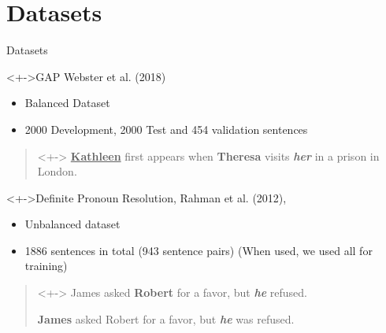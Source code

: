 \documentclass[10pt]{beamer}
\begin{document}
\section{Datasets}
\begin{frame}{Datasets}
  \pause
  \begin{block}<+->{GAP Webster et al. (2018)\cite{webster2018gap}}
    \begin{itemize}
    \item<+-> Balanced Dataset
    \item<+-> 2000 Development, 2000 Test and 454 validation sentences
    \end{itemize}

    \begin{quote}<+->
      \textbf{\underline{Kathleen}} first appears when \textbf{Theresa} visits \textbf{\textit{her}} in a prison in London.
    \end{quote}
  \end{block}

  \begin{block}<+->{Definite Pronoun Resolution, Rahman et al. (2012), \cite{rahman2012resolving}}
    \begin{itemize}
    \item<+-> Unbalanced dataset
    \item<+-> 1886 sentences in total (943 sentence pairs) (When used, we used all for training)
    \end{itemize}

    \begin{quote}<+->
       James asked \textbf{Robert} for a favor, but \textit{\textbf{he}} refused.

       \textbf{James} asked Robert for a favor, but \textit{\textbf{he}} was refused.
      
    \end{quote}
  \end{block}

\end{frame}
\end{document}
